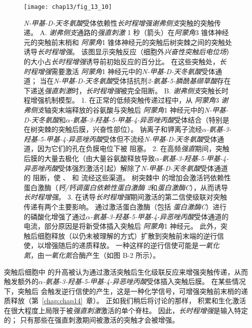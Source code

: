 \begin{figure}[htbp]
	\centering
	\texttt{[image: chap13/fig\_13\_10]}
	\caption{\textit{N-甲基-D-天冬氨酸}受体依赖性\textit{长时程增强}\textit{谢弗侧支}突触的突触传递。
		A. \textit{谢弗侧支}通路的\textit{强直刺激} 1 秒（箭头）在\textit{阿蒙角}3 锥体神经元的突触前末梢和 \textit{阿蒙角}1 锥体神经元的突触后树突棘之间的突触处诱导\textit{长时程增强}。
		该图显示突触反应（细胞外\textit{兴奋性突触后电位场}）的大小占\textit{长时程增强}诱导前初始反应的百分比。
		在这些突触处，\textit{长时程增强}需要激活 \textit{阿蒙角}1 神经元中的\textit{N-甲基-D-天冬氨酸}受体通道； 
		当在\textit{N-甲基-D-天冬氨酸}受体拮抗剂\textit{2-氨基-5-膦酰基缬草酸}存在下递送\textit{强直刺激}时，\textit{长时程增强}被完全阻断\cite{morgan2001electrical}。
		B. \textit{谢弗侧支}突触长时程增强机制模型。
		1. 在正常的低频突触传递过程中，从 \textit{阿蒙角}3 \textit{谢弗侧支}轴突末端释放的谷氨酸与突触后 \textit{阿蒙角}1 神经元中的\textit{N-甲基-D-天冬氨酸}和\textit{$\alpha$-氨基-3-羟基-5-甲基-4-异恶唑丙酸}受体结合（特别是在树突棘的突触后膜，兴奋性部位）。
		钠离子和钾离子流经\textit{$\alpha$-氨基-3-羟基-5-甲基-4-异恶唑丙酸}受体但不流经\textit{N-甲基-D-天冬氨酸}受体通道，因为它们的孔在负膜电位下被  阻塞。
		2. 在高频\textit{强直}期间，突触后膜的大量去极化（由大量谷氨酸释放导致\textit{$\alpha$-氨基-3-羟基-5-甲基-4-异恶唑丙酸}受体强烈激活引起）解除了\textit{N-甲基-D-天冬氨酸}受体通道的  阻断，使 、 和  流经这些渠道。
		树突棘中  的增加会激活钙依赖性蛋白激酶（\textit{钙/钙调蛋白依赖性蛋白激酶 2}和\textit{蛋白激酶C}），从而诱导\textit{长时程增强}。
		3. 在诱导\textit{长时程增强}期间激活的第二信使级联对突触传递有两个主要影响。
		通过激活蛋白激酶（包括 \textit{蛋白激酶C}）进行的磷酸化增强了通过\textit{$\alpha$-氨基-3-羟基-5-甲基-4-异恶唑丙酸}受体通道的电流，部分原因是将新受体插入突触后 \textit{阿蒙角}1 神经元。
		此外，突触后细胞释放（以仍未被理解的方式）扩散到突触前末端的逆行信使，以增强随后的递质释放。
		一种这样的逆行信使可能是\textit{一氧化氮}，由\textit{一氧化氮}合酶产生（如图 B-2 所示）。}
	\label{fig:13_10}
\end{figure}


突触后细胞中  的升高被认为通过激活突触后生化级联反应来增强突触传递，从而触发额外的\textit{$\alpha$-氨基-3-羟基-5-甲基-4-异恶唑丙酸}受体插入突触后膜。
在某些情况下，突触后  会触发逆行信使的产生，这是一种化学信号，可增强突触前末梢的递质释放（第~\ref{chap:chap14}~章）。
正如我们稍后将讨论的那样， 积累和生化激活在很大程度上局限于被\textit{强直刺激}激活的单个脊柱。
因此，\textit{长时程增强}是输入特定的；
只有那些在强直刺激期间被激活的突触才会被增强。



